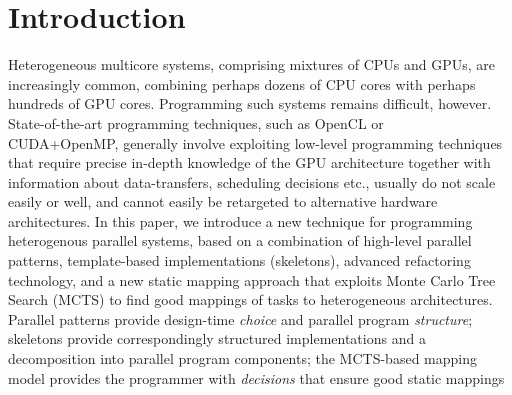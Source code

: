 \documentclass[smallextended]{svjour3}
\begin{document}
\section{Introduction}
\noindent
Heterogeneous multicore systems, comprising mixtures of
CPUs and GPUs, are increasingly common, combining perhaps
dozens of CPU cores with perhaps hundreds of GPU cores.
Programming such systems remains difficult, however.
State-of-the-art programming techniques, such as OpenCL or \\ CUDA+OpenMP,
generally involve exploiting low-level programming techniques that
require precise in-depth knowledge of the GPU architecture together with
information about data-transfers, scheduling decisions etc., usually do not scale easily or well, and cannot easily
be retargeted to alternative hardware architectures.
%
In this paper, we introduce a new technique for programming heterogenous parallel systems,
based on a combination of high-level parallel patterns, %
template-based implementations (skeletons),
advanced refactoring technology, and a new static mapping approach that
exploits Monte Carlo Tree Search (MCTS) to find good mappings of tasks to
heterogeneous architectures. %
Parallel patterns provide design-time \emph{choice} and parallel program \emph{structure};
skeletons provide correspondingly structured implementations and a decomposition into parallel program
components; 
the MCTS-based mapping model provides
the programmer with \emph{decisions} that ensure good static mappings
\end{document}
